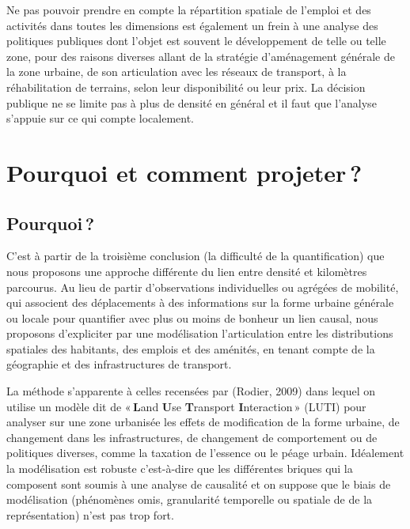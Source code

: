 \documentclass[
  9pt,
  a4paper,
  DIV=11]{scrreprt}
\begin{document}
Ne pas pouvoir prendre en compte la répartition spatiale de l'emploi et
des activités dans toutes les dimensions est également un frein à une
analyse des politiques publiques dont l'objet est souvent le
développement de telle ou telle zone, pour des raisons diverses allant
de la stratégie d'aménagement générale de la zone urbaine, de son
articulation avec les réseaux de transport, à la réhabilitation de
terrains, selon leur disponibilité ou leur prix. La décision publique ne
se limite pas à plus de densité en général et il faut que l'analyse
s'appuie sur ce qui compte localement.

\chapter{Pourquoi et comment
projeter\,?}\label{pourquoi-et-comment-projeter}

\section{Pourquoi\,?}\label{pourquoi}

C'est à partir de la troisième conclusion (la difficulté de la
quantification) que nous proposons une approche différente du lien entre
densité et kilomètres parcourus. Au lieu de partir d'observations
individuelles ou agrégées de mobilité, qui associent des déplacements à
des informations sur la forme urbaine générale ou locale pour quantifier
avec plus ou moins de bonheur un lien causal, nous proposons
d'expliciter par une modélisation l'articulation entre les distributions
spatiales des habitants, des emplois et des aménités, en tenant compte
de la géographie et des infrastructures de transport.

La méthode s'apparente à celles recensées par (Rodier, 2009) dans lequel
on utilise un modèle dit de «\,\textbf{L}and \textbf{U}se
\textbf{T}ransport \textbf{I}nteraction\,» (LUTI) pour analyser sur une
zone urbanisée les effets de modification de la forme urbaine, de
changement dans les infrastructures, de changement de comportement ou de
politiques diverses, comme la taxation de l'essence ou le péage urbain.
Idéalement la modélisation est robuste c'est-à-dire que les différentes
briques qui la composent sont soumis à une analyse de causalité et on
suppose que le biais de modélisation (phénomènes omis, granularité
temporelle ou spatiale de de la représentation) n'est pas trop fort.
\end{document}
